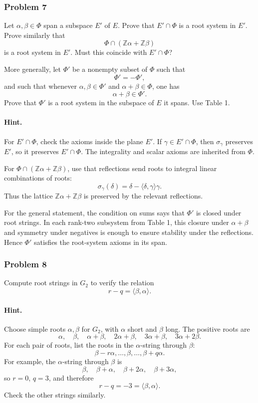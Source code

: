 \documentclass[12pt, a4paper]{article}
\begin{document}
\subsubsection{Problem 7}

Let \(\alpha,\beta\in\Phi\) span a subspace \(E'\) of \(E\). Prove that
\(E'\cap\Phi\) is a root system in \(E'\). Prove similarly that
\[
\Phi\cap(\mathbb Z\alpha+\mathbb Z\beta)
\]
is a root system in \(E'\). Must this coincide with \(E'\cap\Phi\)?

More generally, let \(\Phi'\) be a nonempty subset of \(\Phi\) such that
\[
\Phi'=-\Phi',
\]
and such that whenever \(\alpha,\beta\in\Phi'\) and
\(\alpha+\beta\in\Phi\), one has
\[
\alpha+\beta\in\Phi'.
\]
Prove that \(\Phi'\) is a root system in the subspace of \(E\) it spans. Use
Table 1.

\paragraph{Hint.}
For \(E'\cap\Phi\), check the axioms inside the plane \(E'\). If
\(\gamma\in E'\cap\Phi\), then \(\sigma_\gamma\) preserves \(E'\), so it
preserves \(E'\cap\Phi\). The integrality and scalar axioms are inherited from
\(\Phi\).

For \(\Phi\cap(\mathbb Z\alpha+\mathbb Z\beta)\), use that reflections send
roots to integral linear combinations of roots:
\[
\sigma_\gamma(\delta)=\delta-\langle \delta,\gamma\rangle\gamma.
\]
Thus the lattice \(\mathbb Z\alpha+\mathbb Z\beta\) is preserved by the
relevant reflections.

For the general statement, the condition on sums says that \(\Phi'\) is closed
under root strings. In each rank-two subsystem from Table 1, this closure under
\(\alpha+\beta\) and symmetry under negatives is enough to ensure stability
under the reflections. Hence \(\Phi'\) satisfies the root-system axioms in its
span.

\subsubsection{Problem 8}

Compute root strings in \(G_2\) to verify the relation
\[
r-q=\langle \beta,\alpha\rangle.
\]

\paragraph{Hint.}
Choose simple roots \(\alpha,\beta\) for \(G_2\), with \(\alpha\) short and
\(\beta\) long. The positive roots are
\[
\alpha,\quad \beta,\quad \alpha+\beta,\quad 2\alpha+\beta,\quad
3\alpha+\beta,\quad 3\alpha+2\beta.
\]
For each pair of roots, list the roots in the \(\alpha\)-string through
\(\beta\):
\[
\beta-r\alpha,\ldots,\beta,\ldots,\beta+q\alpha.
\]
For example, the \(\alpha\)-string through \(\beta\) is
\[
\beta,\quad \beta+\alpha,\quad \beta+2\alpha,\quad \beta+3\alpha,
\]
so \(r=0\), \(q=3\), and therefore
\[
r-q=-3=\langle \beta,\alpha\rangle.
\]
Check the other strings similarly.
\end{document}
